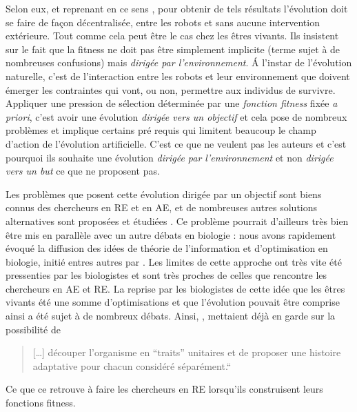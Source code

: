 Selon eux, et reprenant en ce sens \cite{watson02embodiedevolutiondistributingevolutionaryalgorithmpopulationrobots}, pour obtenir de tels résultats l'évolution doit se faire de façon décentralisée, entre les robots et sans aucune intervention extérieure. Tout comme cela peut être le cas chez les êtres vivants. Ils insistent sur le fait que la fitness ne doit pas être simplement implicite (terme sujet à de nombreuses confusions) mais \emph{dirigée par l'environnement}. \'A l'instar de l'évolution naturelle, c'est de l'interaction entre les robots et leur environnement que doivent émerger les contraintes qui vont, ou non, permettre aux individus de survivre. Appliquer une pression de sélection déterminée par une \emph{fonction fitness} fixée \emph{a priori}, c'est avoir une évolution \emph{dirigée vers un objectif} et cela pose de nombreux problèmes et implique certains pré requis qui limitent beaucoup le champ d'action de l'évolution artificielle. C'est ce que ne veulent pas les auteurs et c'est pourquoi ils souhaite une évolution \emph{dirigée par l'environnement} et non \emph{dirigée vers un but} ce que \cite{watson02embodiedevolutiondistributingevolutionaryalgorithmpopulationrobots} ne proposent pas.

Les problèmes que posent cette évolution dirigée par un objectif sont biens connus des chercheurs en RE et en AE, et de nombreuses autres solutions alternatives sont proposées et étudiées \citep{lehman10efficientlyevolvingprogramsthroughsearchnovelty,lehman2011abandoningobjectivesevolutionthroughthesearchfornoveltyalone,risi2009hownoveltysearchescapesthedeceptivetrapoflearningtolearn,mouret2012encouragingbehavioraldiversityinevolutionaryrobotics}. Ce problème pourrait d'ailleurs très bien être mis en parallèle avec un autre débats en biologie : nous avons rapidement évoqué la diffusion des idées de théorie de l'information et d'optimisation en biologie, initié entres autres par \cite{maynardsmith78optimizationtheoryinevolution}. Les limites de cette approche ont très vite été pressenties par les biologistes et sont très proches de celles que rencontre les chercheurs en AE et RE. La reprise par les biologistes de cette idée que les êtres vivants été une somme d'optimisations et que l'évolution pouvait être comprise ainsi a été sujet à de nombreux débats.
Ainsi, \cite{gould1979spandrelssanmarcopanglossianparadigmcritiqueadaptationistprogramme}, mettaient déjà en garde sur la possibilité de 

\begin{quote}
	[\ldots] découper l'organisme en ``traits'' unitaires et de proposer une histoire adaptative pour chacun considéré séparément.``
\end{quote}
Ce que ce retrouve à faire les chercheurs en RE lorsqu'ils construisent leurs fonctions fitness.

